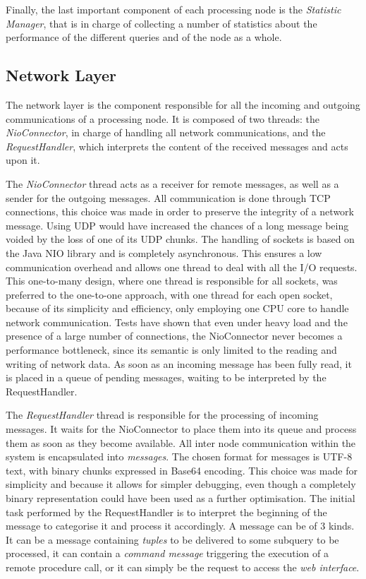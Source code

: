Finally, the last important component of each processing node is the \emph{Statistic Manager}, that is in
charge of collecting a number of statistics about the performance of the different queries and of the node as a whole. 

\subsection{Network Layer}  %

The network layer is the component responsible for all the incoming and outgoing communications of a
processing node. It is composed of two threads: the \emph{NioConnector}, in charge of handling all
network communications, and the \emph{RequestHandler}, which interprets the content of the received messages and acts upon it.

The \emph{NioConnector} thread acts as a receiver for remote messages, as well as a sender for the
outgoing messages. All communication is done through TCP connections, this choice was made in order to preserve
the integrity of a network message. Using UDP would have increased the chances of a long message being
voided by the loss of one of its UDP chunks. The handling of sockets is based on the Java NIO library and
is completely asynchronous. This ensures a low communication overhead and allows one thread to deal with
all the I/O requests. This one-to-many design, where one thread is responsible for all sockets, was
preferred to the one-to-one approach, with one thread for each open socket, because of its simplicity and
efficiency, only employing one CPU core to handle network communication. Tests have shown that even under
heavy load and the presence of a large number of connections, the NioConnector never becomes a
performance bottleneck, since its semantic is only limited to the reading and writing of network data. 
As soon as an incoming message has been fully read, it is placed in a queue of pending messages, waiting
to be interpreted by the RequestHandler.

The \emph{RequestHandler} thread is responsible for the processing of incoming messages. It waits for the
NioConnector to place them into its queue and process them as soon as they become available. All inter
node communication within the system is encapsulated into \emph{messages}. 
The chosen format for messages is UTF-8 text, with
binary chunks expressed in Base64 encoding. This choice was made for simplicity and because it allows
for simpler debugging, even though a completely binary representation could have been used as a further
optimisation.
The initial task performed by the RequestHandler is to interpret the beginning of the message to
categorise it and process it accordingly. A message can be of 3 kinds. It can be a message containing
\emph{tuples} to be delivered to some subquery to be processed, it can contain a \emph{command
message} triggering the execution of a remote procedure call, or it can simply be the request to access
the \emph{web interface}.

